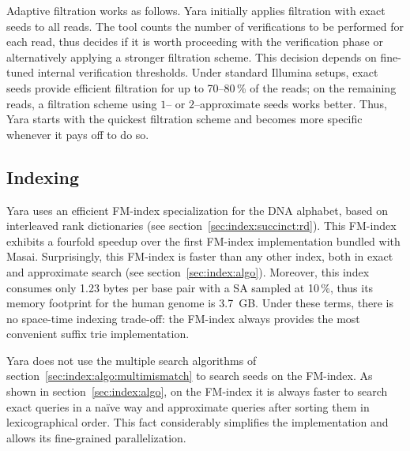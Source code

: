 Adaptive filtration works as follows.
Yara initially applies filtration with exact seeds to all reads.
The tool counts the number of verifications to be performed for each read, thus decides if it is worth proceeding with the verification phase or alternatively applying a stronger filtration scheme.
This decision depends on fine-tuned internal verification thresholds.
Under standard Illumina setups, exact seeds provide efficient filtration for up to 70--80\,\% of the reads; on the remaining reads, a filtration scheme using $1$-- or $2$--approximate seeds works better.
Thus, Yara starts with the quickest filtration scheme and becomes more specific whenever it pays off to do so.


\subsection{Indexing}
\label{sec:yara:eng:indexing}

Yara uses an efficient FM-index specialization for the DNA alphabet, based on interleaved rank dictionaries (see section~\ref{sec:index:succinct:rd}).
This FM-index exhibits a fourfold speedup over the first FM-index implementation bundled with Masai.
Surprisingly, this FM-index is faster than any other index, both in exact and approximate search (see section~\ref{sec:index:algo}).
Moreover, this index consumes only 1.23 bytes per base pair with a SA sampled at 10\,\%, thus its memory footprint for the human genome is 3.7~GB.
Under these terms, there is no space-time indexing trade-off: the FM-index always provides the most convenient suffix trie implementation.

Yara does not use the multiple search algorithms of section~\ref{sec:index:algo:multimismatch} to search seeds on the FM-index.
As shown in section~\ref{sec:index:algo}, on the FM-index it is always faster to search exact queries in a na\"ive way and approximate queries after sorting them in lexicographical order.
This fact considerably simplifies the implementation and allows its fine-grained parallelization.

